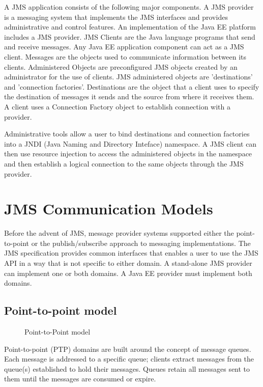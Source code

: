 \documentclass[9pt,twocolumn,twoside]{styles/osajnl}
\begin{document}
A JMS application consists of the following major components.  A JMS
provider is a messaging system that implements the JMS interfaces and
provides administrative and control features. An implementation of the
Java EE platform includes a JMS provider. \cite{www-jms-tutorialoracle} JMS Clients are the Java
language programs that send and receive messages. Any Java EE
application component can act as a JMS client.  Messages are the
objects used to communicate information between its clients.
Administered Objects are preconfigured JMS objects created by an
administrator for the use of clients.  JMS administered objects are
'destinations' and 'connection factories'. Destinations are the object
that a client uses to specify the destination of messages it sends and
the source from where it receives them.  A client uses a Connection
Factory object to establish connection with a provider.

Administrative tools allow a user to bind destinations and connection
factories into a JNDI (Java Naming and Directory Inteface)
namespace. A JMS client can then use resource injection to access the
administered objects in the namespace and then establish a logical
connection to the same objects through the JMS provider. \cite{www-jms-tutorialoracle}


\section{JMS Communication Models}

Before the advent of JMS, message provider systems supported either
the point-to-point or the publish/subscribe approach to messaging
implementations. The JMS specification provides common interfaces that
enables a user to use the JMS API in a way that is not specific to
either domain. A stand-alone JMS provider can implement one or both
domains. A Java EE provider must implement both domains.

\subsection{Point-to-point model}

\begin{figure}[htbp]
\centering
{}
\caption{\cite{www-jms-tutorialoracle} Point-to-Point model}
\label{fig:Point-to-Point messaging}
\end{figure}

Point-to-point (PTP) domains are built around the concept of message
queues.  Each message is addressed to a specific queue; clients
extract messages from the queue(s) established to hold their
messages. Queues retain all messages sent to them until the messages
are consumed or expire.
\end{document}
